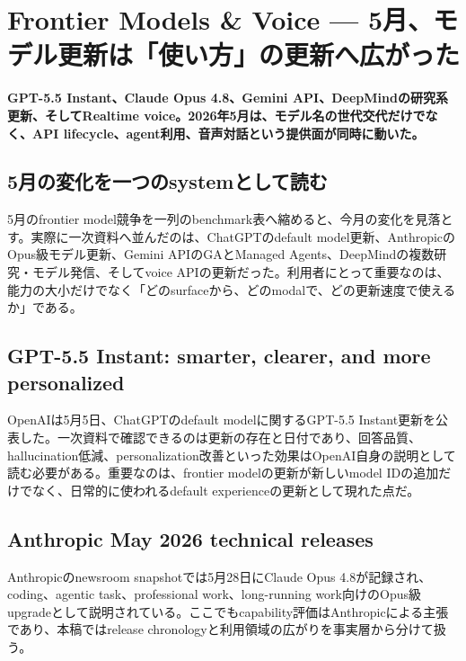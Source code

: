 \section{Frontier Models \& Voice — 5月、モデル更新は「使い方」の更新へ広がった}
\noindent\textbf{GPT-5.5 Instant、Claude Opus 4.8、Gemini API、DeepMindの研究系更新、そしてRealtime voice。2026年5月は、モデル名の世代交代だけでなく、API lifecycle、agent利用、音声対話という提供面が同時に動いた。}\autocite{src-01a8b52eee81,src-24a3c172de48,src-5c3d93bd7160,src-a24fd97eb3d0,src-dd5d9b8662f3,src-eac8dfbeb78c,src-f6aa679babd7}

\subsection{5月の変化を一つのsystemとして読む}

5月のfrontier model競争を一列のbenchmark表へ縮めると、今月の変化を見落とす。実際に一次資料へ並んだのは、ChatGPTのdefault model更新、AnthropicのOpus級モデル更新、Gemini APIのGAとManaged Agents、DeepMindの複数研究・モデル発信、そしてvoice APIの更新だった。利用者にとって重要なのは、能力の大小だけでなく「どのsurfaceから、どのmodalで、どの更新速度で使えるか」である。\autocite{src-01a8b52eee81,src-24a3c172de48,src-5c3d93bd7160,src-a24fd97eb3d0,src-dd5d9b8662f3,src-eac8dfbeb78c,src-f6aa679babd7}


\subsection{GPT-5.5 Instant: smarter, clearer, and more personalized}

OpenAIは5月5日、ChatGPTのdefault modelに関するGPT-5.5 Instant更新を公表した。一次資料で確認できるのは更新の存在と日付であり、回答品質、hallucination低減、personalization改善といった効果はOpenAI自身の説明として読む必要がある。重要なのは、frontier modelの更新が新しいmodel IDの追加だけでなく、日常的に使われるdefault experienceの更新として現れた点だ。\autocite{src-01a8b52eee81}


\subsection{Anthropic May 2026 technical releases}

Anthropicのnewsroom snapshotでは5月28日にClaude Opus 4.8が記録され、coding、agentic task、professional work、long-running work向けのOpus級upgradeとして説明されている。ここでもcapability評価はAnthropicによる主張であり、本稿ではrelease chronologyと利用領域の広がりを事実層から分けて扱う。\autocite{src-f6aa679babd7}



